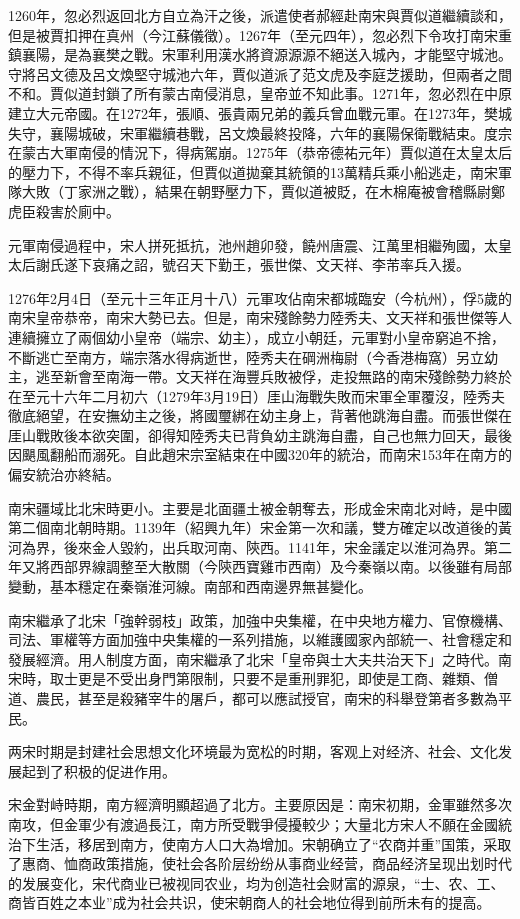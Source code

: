 1260年，忽必烈返回北方自立為汗之後，派遣使者郝經赴南宋與賈似道繼續談和，但是被賈扣押在真州（今江蘇儀徵）。1267年（至元四年），忽必烈下令攻打南宋重鎮襄陽，是為襄樊之戰。宋軍利用漢水將資源源源不絕送入城內，才能堅守城池。守將呂文德及呂文煥堅守城池六年，賈似道派了范文虎及李庭芝援助，但兩者之間不和。賈似道封鎖了所有蒙古南侵消息，皇帝並不知此事。1271年，忽必烈在中原建立大元帝國。在1272年，張順、張貴兩兄弟的義兵曾血戰元軍。在1273年，樊城失守，襄陽城破，宋軍繼續巷戰，呂文煥最終投降，六年的襄陽保衛戰結束。度宗在蒙古大軍南侵的情況下，得病駕崩。1275年（恭帝德祐元年）賈似道在太皇太后的壓力下，不得不率兵親征，但賈似道拋棄其統領的13萬精兵乘小船逃走，南宋軍隊大敗（丁家洲之戰），結果在朝野壓力下，賈似道被貶，在木棉庵被會稽縣尉鄭虎臣殺害於廁中。

元軍南侵過程中，宋人拼死抵抗，池州趙卯發，饒州唐震、江萬里相繼殉國，太皇太后謝氏遂下哀痛之詔，號召天下勤王，張世傑、文天祥、李芾率兵入援。

1276年2月4日（至元十三年正月十八）元軍攻佔南宋都城臨安（今杭州），俘5歲的南宋皇帝恭帝，南宋大勢已去。但是，南宋殘餘勢力陸秀夫、文天祥和張世傑等人連續擁立了兩個幼小皇帝（端宗、幼主），成立小朝廷，元軍對小皇帝窮追不捨，不斷逃亡至南方，端宗落水得病逝世，陸秀夫在碙洲梅尉（今香港梅窩）另立幼主，逃至新會至南海一帶。文天祥在海豐兵敗被俘，走投無路的南宋殘餘勢力終於在至元十六年二月初六（1279年3月19日）厓山海戰失敗而宋軍全軍覆沒，陸秀夫徹底絕望，在安撫幼主之後，將國璽綁在幼主身上，背著他跳海自盡。而張世傑在厓山戰敗後本欲突圍，卻得知陸秀夫已背負幼主跳海自盡，自己也無力回天，最後因颶風翻船而溺死。自此趙宋宗室結束在中國320年的統治，而南宋153年在南方的偏安統治亦終結。

南宋疆域比北宋時更小。主要是北面疆土被金朝奪去，形成金宋南北对峙，是中國第二個南北朝時期。1139年（紹興九年）宋金第一次和議，雙方確定以改道後的黃河為界，後來金人毀約，出兵取河南、陝西。1141年，宋金議定以淮河為界。第二年又將西部界線調整至大散關（今陝西寶雞市西南）及今秦嶺以南。以後雖有局部變動，基本穩定在秦嶺淮河線。南部和西南邊界無甚變化。

南宋繼承了北宋「強幹弱枝」政策，加強中央集權，在中央地方權力、官僚機構、司法、軍權等方面加強中央集權的一系列措施，以維護國家內部統一、社會穩定和發展經濟。用人制度方面，南宋繼承了北宋「皇帝與士大夫共治天下」之時代。南宋時，取士更是不受出身門第限制，只要不是重刑罪犯，即使是工商、雜類、僧道、農民，甚至是殺豬宰牛的屠戶，都可以應試授官，南宋的科舉登第者多數為平民。

两宋时期是封建社会思想文化环境最为宽松的时期，客观上对经济、社会、文化发展起到了积极的促进作用。

宋金對峙時期，南方經濟明顯超過了北方。主要原因是：南宋初期，金軍雖然多次南攻，但金軍少有渡過長江，南方所受戰爭侵擾較少；大量北方宋人不願在金國統治下生活，移居到南方，使南方人口大為增加。宋朝确立了“农商并重”国策，采取了惠商、恤商政策措施，使社会各阶层纷纷从事商业经营，商品经济呈现出划时代的发展变化，宋代商业已被视同农业，均为创造社会财富的源泉，“士、农、工、商皆百姓之本业”成为社会共识，使宋朝商人的社会地位得到前所未有的提高。

